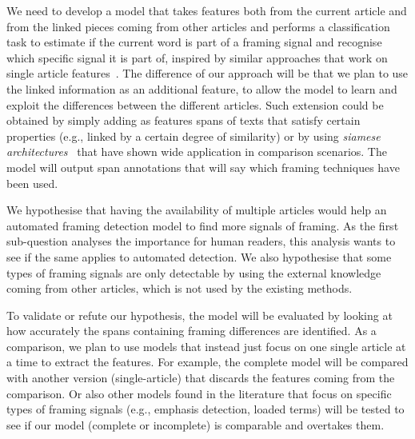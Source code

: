 We need to develop a model that takes features both from the current article and from the linked pieces coming from other articles and performs a classification task to estimate if the current word is part of a framing signal and recognise which specific signal it is part of, inspired by similar approaches that work on single article features~\cite{da2019fine}.
The difference of our approach will be that we plan to use the linked information as an additional feature, to allow the model to learn and exploit the differences between the different articles.
Such extension could be obtained by simply adding as features spans of texts that satisfy certain properties (e.g., linked by a certain degree of similarity) or by using \emph{siamese architectures}~\cite{bromley1994signature} that have shown wide application in comparison scenarios.
The model will output span annotations that will say which framing techniques have been used.


We hypothesise that having the availability of multiple articles would help an automated framing detection model to find more signals of framing.
As the first sub-question analyses the importance for human readers, this analysis wants to see if the same applies to automated detection.
We also hypothesise that some types of framing signals are only detectable by using the external knowledge coming from other articles, which is not used by the existing methods.

To validate or refute our hypothesis, the model will be evaluated by looking at how accurately the spans containing framing differences are identified.
As a comparison, we plan to use models that instead just focus on one single article at a time to extract the features.
For example, the complete model will be compared with another version (single-article) that discards the features coming from the comparison.
Or also other models found in the literature that focus on specific types of framing signals (e.g., emphasis detection, loaded terms) will be tested to see if our model (complete or incomplete) is comparable and overtakes them.


